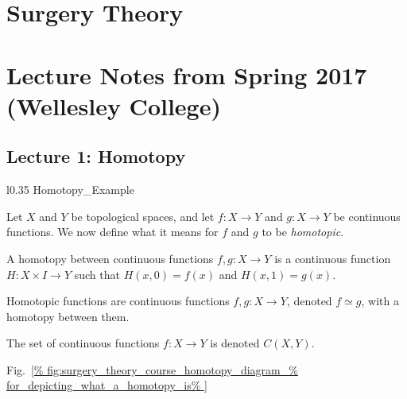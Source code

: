 \documentclass[crop=false,class=article,oneside]{standalone}
\begin{document}
    \ifx\ifmathcoursessurgery\undefined
        \section*{Surgery Theory}
        \setcounter{section}{1}
        \renewcommand\thefigure{\arabic{section}.\arabic{figure}}
        \renewcommand\thesubfigure{%
            \arabic{section}.\arabic{figure}.\arabic{subfigure}}
    \else
        \section{Lecture Notes from Spring 2017 (Wellesley College)}
    \fi
    \subsection{Lecture 1: Homotopy}
        \begin{wrapfigure}[8]{l}{0.35\textwidth}
            \centering
            \captionsetup{type=figure}
            {Homotopy_Example}
            \caption[Homotopy Diagram.]
                    {Diagram for a homotopy between two
                    functions $f,g:X\rightarrow Y$.}
            \label{fig:surgery_theory_course_homotopy_diagram_%
                   for_depicting_what_a_homotopy_is}
        \end{wrapfigure}
        Let $X$ and $Y$ be topological spaces, and let
        $f:{X}\rightarrow{Y}$ and $g:{X}\rightarrow{Y}$
        be continuous functions. We now define what it
        means for $f$ and $g$ to be \textit{homotopic}.
        \begin{definition}
            A homotopy between continuous functions
            $f,g:{X}\rightarrow{Y}$ is a continuous
            function $H:{X}\times{I}\rightarrow{Y}$
            such that $H(x,0)=f(x)$ and $H(x,1)=g(x)$.
        \end{definition}
        \begin{definition}
            Homotopic functions are continuous functions
            $f,g:{X}\rightarrow{Y}$, denoted ${f}\simeq{g}$,
            with a homotopy between them.
        \end{definition}
        \begin{notation}
            The set of continuous functions
            $f:{X}\rightarrow{Y}$ is denoted $C(X,Y)$.
        \end{notation}
        Fig.~\ref{%
            fig:surgery_theory_course_homotopy_diagram_%
            for_depicting_what_a_homotopy_is%
        }
\end{document}
